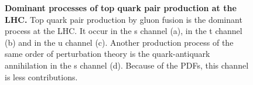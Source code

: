 \begin{figure}
\hfill
{}
\hfill
{}
\hfill
{}
\hfill
{}
\hfill
\caption[Dominant Processes of Top Quark Pair Production]{\textbf{Dominant processes of top quark pair production at the LHC.} Top quark pair production by gluon fusion is the dominant process at the LHC. It occur in the s channel (a), in the t channel (b) and in the u channel (c). Another production process of the same order of perturbation theory is the quark-antiquark annihilation in the s channel (d). Because of the PDFs, this channel is less contributions.}
\label{fig:ch_5_ttProduction}
\end{figure}

